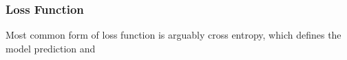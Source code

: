 \subsubsection{Loss Function}

Most common form of loss function is arguably cross entropy, which defines the model prediction and 